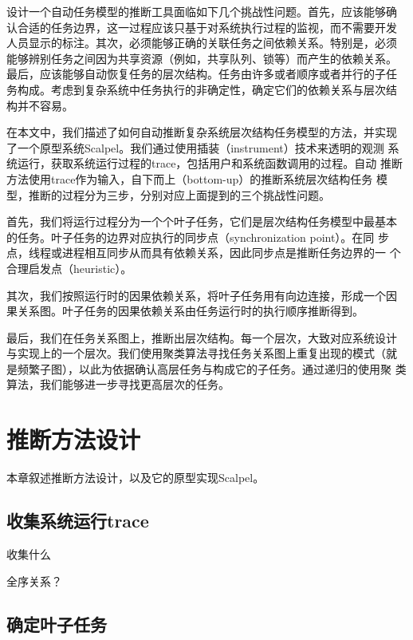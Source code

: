 设计一个自动任务模型的推断工具面临如下几个挑战性问题。首先，应该能够确
认合适的任务边界，这一过程应该只基于对系统执行过程的监视，而不需要开发
人员显示的标注。其次，必须能够正确的关联任务之间依赖关系。特别是，必须
能够辨别任务之间因为共享资源（例如，共享队列、锁等）而产生的依赖关系。
最后，应该能够自动恢复任务的层次结构。任务由许多或者顺序或者并行的子任
务构成。考虑到复杂系统中任务执行的非确定性，确定它们的依赖关系与层次结
构并不容易。

在本文中，我们描述了如何自动推断复杂系统层次结构任务模型的方法，并实现
了一个原型系统Scalpel。我们通过使用插装（instrument）技术来透明的观测
系统运行，获取系统运行过程的trace，包括用户和系统函数调用的过程。自动
推断方法使用trace作为输入，自下而上（bottom-up）的推断系统层次结构任务
模型，推断的过程分为三步，分别对应上面提到的三个挑战性问题。

首先，我们将运行过程分为一个个叶子任务，它们是层次结构任务模型中最基本
的任务。叶子任务的边界对应执行的同步点（synchronization point）。在同
步点，线程或进程相互同步从而具有依赖关系，因此同步点是推断任务边界的一
个合理启发点（heuristic）。

其次，我们按照运行时的因果依赖关系，将叶子任务用有向边连接，形成一个因
果关系图。叶子任务的因果依赖关系由任务运行时的执行顺序推断得到。

最后，我们在任务关系图上，推断出层次结构。每一个层次，大致对应系统设计
与实现上的一个层次。我们使用聚类算法寻找任务关系图上重复出现的模式（就
是频繁子图），以此为依据确认高层任务与构成它的子任务。通过递归的使用聚
类算法，我们能够进一步寻找更高层次的任务。




\section{推断方法设计}

本章叙述推断方法设计，以及它的原型实现\pozhehao{}Scalpel。

\subsection{收集系统运行trace}
收集什么

全序关系？



\subsection{确定叶子任务}

